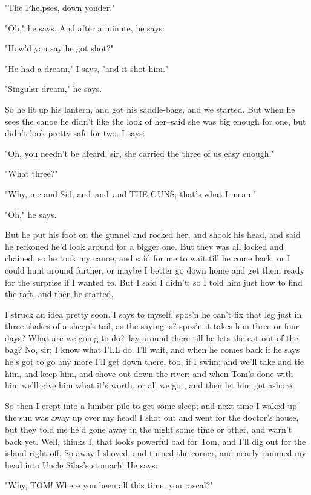 "The Phelpses, down yonder."

"Oh," he says.  And after a minute, he says:

"How'd you say he got shot?"

"He had a dream," I says, "and it shot him."

"Singular dream," he says.

So he lit up his lantern, and got his saddle-bags, and we started.  But
when he sees the canoe he didn't like the look of her--said she was big
enough for one, but didn't look pretty safe for two.  I says:

"Oh, you needn't be afeard, sir, she carried the three of us easy
enough."

"What three?"

"Why, me and Sid, and--and--and THE GUNS; that's what I mean."

"Oh," he says.

But he put his foot on the gunnel and rocked her, and shook his head, and
said he reckoned he'd look around for a bigger one.  But they was all
locked and chained; so he took my canoe, and said for me to wait till he
come back, or I could hunt around further, or maybe I better go down home
and get them ready for the surprise if I wanted to.  But I said I didn't;
so I told him just how to find the raft, and then he started.

I struck an idea pretty soon.  I says to myself, spos'n he can't fix that
leg just in three shakes of a sheep's tail, as the saying is? spos'n it
takes him three or four days?  What are we going to do?--lay around there
till he lets the cat out of the bag?  No, sir; I know what I'LL do.  I'll
wait, and when he comes back if he says he's got to go any more I'll get
down there, too, if I swim; and we'll take and tie him, and keep him, and
shove out down the river; and when Tom's done with him we'll give him
what it's worth, or all we got, and then let him get ashore.

So then I crept into a lumber-pile to get some sleep; and next time I
waked up the sun was away up over my head!  I shot out and went for the
doctor's house, but they told me he'd gone away in the night some time or
other, and warn't back yet.  Well, thinks I, that looks powerful bad for
Tom, and I'll dig out for the island right off.  So away I shoved, and
turned the corner, and nearly rammed my head into Uncle Silas's stomach!
He says:

"Why, TOM!  Where you been all this time, you rascal?"

